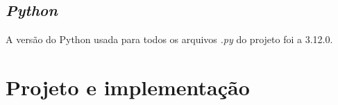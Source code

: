     
     \subsection{\textit{Python}} 

    A versão do Python usada para todos os arquivos \textit{.py} do projeto foi a 3.12.0.

     
     

    







\section{Projeto e implementação}

